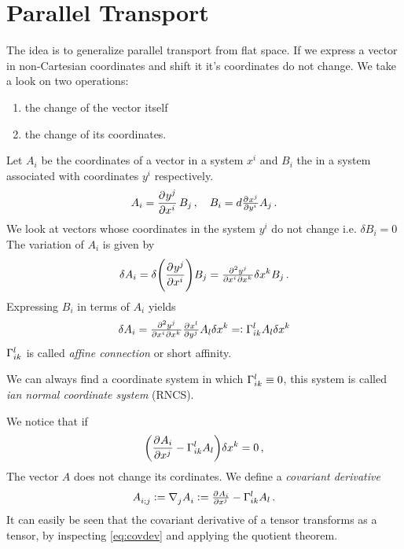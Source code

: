 \section{Parallel Transport}
The idea is to generalize parallel transport from flat space.
If we express a vector in non-Cartesian coordinates and shift it it's
coordinates do not change.
We take a look on two operations:
\begin{enumerate}
\item the change of the vector itself
\item the change of its coordinates.
\end{enumerate}
Let $A_i$ be the coordinates of a vector in a system $x^i$ and $B_i$ the in a
system associated with coordinates $y^i$ respectively.
\begin{equation}
A_i=\dpd{{y^j}}{{x^i}}B_j\, ,\quad B_i=d\pd{{x^j}}{{y^i}}A_j\, .
\end{equation}
We look at vectors whose coordinates in the system $y^i$ do not change i.e.
$\delta B_i=0$ The variation of $A_i$ is given by
\begin{equation}
\delta
A_i=\delta\left(\dpd{{y^j}}{{x^i}}\right)B_j
=\md{{y^j}}{2}{{x^i}}{}{{x^k}}{}\delta
x^k B_j\, .
\end{equation}
Expressing $B_i$ in terms of $A_i$ yields
\begin{equation}
\delta A_i = \md{{y^j}}{2}{{x^i}}{}{{x^k}}{}\pd{{x^l}}{{y^j}}A_l\delta x^k
=:\affin{l}{i}{k}A_l\delta x^k
\end{equation}
$\Gamma^{l}_{i k}$ is called \emph{affine connection} or short affinity.
\begin{remark}
We can always find a coordinate system in which $\Gamma^{l}_{i k}\equiv 0$, this
system is called \emph{ian normal coordinate system} (RNCS).
\end{remark}
We notice that if 
\begin{equation}
\left(\dpd{{A_i}}{{x^j}}-\affin{l}{i}{k}A_l\right)\delta x^k = 0\,
,\label{eq:covdev}
\end{equation}
The vector $A$ does not change its cordinates. We define a \emph{covariant
derivative} 
\begin{equation}
\tensor{A}{_i_;_j}:=\tensor{\nabla}{_j}\tensor{A}{_i}:=\pd{{A_i}}{{x^j}}-\affin{l}{i}{k}A_l\,
.
\end{equation}
It can easily be seen that the covariant derivative of a tensor transforms as a
tensor, by inspecting \eqref{eq:covdev} and applying the quotient theorem.
